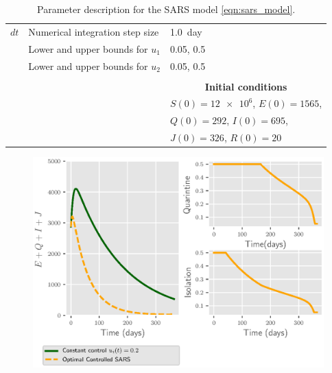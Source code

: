 \begin{table}[htb]
\begin{center}
\begin{tabular}{@{}rll@{}}
        \\
        $dt$
          & Numerical integration step size
          & \SI{1.0}{day}
        \\
          & Lower and upper bounds for $u_1$
          & \num{.05}, \num{0.5}
        \\
          & Lower and upper bounds for $u_2$
          & \num{.05}, \num{0.5}
        \\
        \\
         && \multicolumn{1}{c}{\bf{Initial conditions}}
        \\
         \cmidrule{3-3}
         && $S(0)=\num{12e6}$, $E(0)=1565$,
         \\
          && $Q(0)=292$, $I(0)=\num{695}$,
         \\
         && $J(0)=\num{326}$, $R(0)=\num{20}$
        \\
        \bottomrule
      \end{tabular}
     \caption{Parameter description for the SARS model
     \eqref{eqn:sars_model}.}
     \label{tbl:sars_table}
     \end{center}
\end{table}

\begin{figure}[htb]
  \centering
  \includegraphics{Figures/figure_1_sars}
  \caption{}
  \label{fig:figure1sars}
\end{figure}

